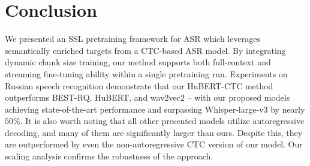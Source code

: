 \documentclass{Interspeech}
\begin{document}
\section{Conclusion}

We presented an SSL pretraining framework for ASR which leverages semantically enriched targets from a CTC-based ASR model. By integrating dynamic chunk size training, our method supports both full-context and streaming fine-tuning ability within a single pretraining run. Experiments on Russian speech recognition demonstrate that our HuBERT-CTC method outperforms BEST-RQ, HuBERT, and wav2vec2 -- with our proposed models achieving state-of-the-art performance and surpassing Whisper-large-v3 by nearly $50\%$. It is also worth noting that all other presented models utilize autoregressive decoding, and many of them are significantly larger than ours. Despite this, they are outperformed by even the non-autoregressive CTC version of our model. Our scaling analysis confirms the robustness of the approach.






\end{document}
